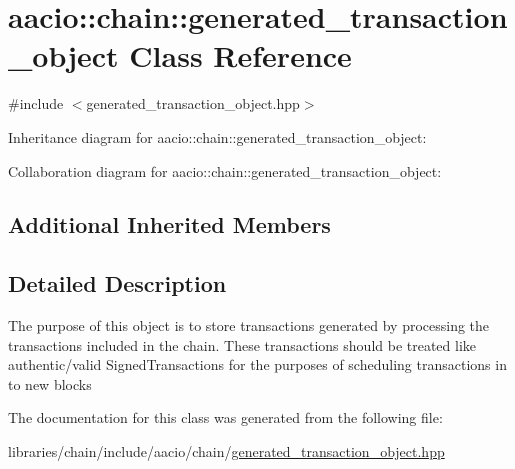 \hypertarget{classaacio_1_1chain_1_1generated__transaction__object}{}\section{aacio\+:\+:chain\+:\+:generated\+\_\+transaction\+\_\+object Class Reference}
\label{classaacio_1_1chain_1_1generated__transaction__object}


{\ttfamily \#include $<$generated\+\_\+transaction\+\_\+object.\+hpp$>$}



Inheritance diagram for aacio\+:\+:chain\+:\+:generated\+\_\+transaction\+\_\+object\+:


Collaboration diagram for aacio\+:\+:chain\+:\+:generated\+\_\+transaction\+\_\+object\+:
\subsection*{Additional Inherited Members}


\subsection{Detailed Description}
The purpose of this object is to store transactions generated by processing the transactions included in the chain. These transactions should be treated like authentic/valid Signed\+Transactions for the purposes of scheduling transactions in to new blocks 

The documentation for this class was generated from the following file\+:\begin{DoxyCompactItemize}
\item 
libraries/chain/include/aacio/chain/\mbox{\hyperlink{generated__transaction__object_8hpp}{generated\+\_\+transaction\+\_\+object.\+hpp}}\end{DoxyCompactItemize}
